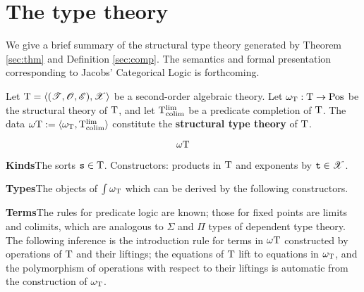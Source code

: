 \section{The type theory}
\label{sec:typeth}

We give a brief summary of the structural type theory generated by Theorem \ref{sec:thm} and Definition \ref{sec:comp}. The semantics and formal presentation corresponding to Jacobs' Categorical Logic \cite{jacobs} is forthcoming.

\begin{definition}
  \label{sec:ty}
  Let $\mathrm{T} = \langle (\mathscr{T},\mathscr{O},\mathscr{E}),\mathscr{X}\rangle$ be a second-order algebraic theory. Let $\omega_{\mathrm{T}}:\mathrm{T}\to \mathrm{Pos}$ be the structural theory of $\mathrm{T}$, and let $\mathrm{T}_{\mathrm{colim}}^{\mathrm{lim}}$ be a predicate completion of $\mathrm{T}$. The data $\omega\mathrm{T} := \langle \omega_{\mathrm{T}}, \mathrm{T}_{\mathrm{colim}}^{\mathrm{lim}}\rangle$ constitute the \textbf{structural type theory} of $\mathrm{T}$.
\end{definition}
\vspace*{-\baselineskip}
$$\omega\mathrm{T}$$

\textbf{Kinds}\quad The sorts $\mathtt{s}\in \mathrm{T}$. Constructors: products in $\mathrm{T}$ and exponents by $\mathtt{t}\in \mathscr{X}$.

\textbf{Types}\quad The objects of $\int \omega_{\mathrm{T}}$ which can be derived by the following constructors.

\textbf{Terms}\quad The rules for predicate logic are known; those for fixed points are limits and colimits, which are analogous to $\Sigma$ and $\Pi$ types of dependent type theory. The following inference is the introduction rule for terms in $\omega\mathrm{T}$ constructed by operations of $\mathrm{T}$ and their liftings; the equations of $\mathrm{T}$ lift to equations in $\omega_{\mathrm{T}}$, and the polymorphism of operations with respect to their liftings is automatic from the construction of $\omega_{\mathrm{T}}$.


